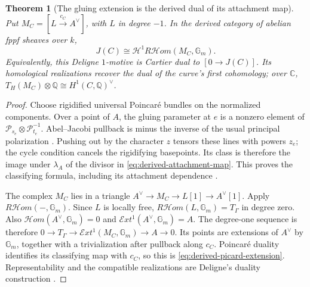 \documentclass[11pt]{article}
\newtheorem{theorem}{Theorem}[section]
\theoremstyle{definition}
\theoremstyle{remark}
\newcommand{\Q}{\mathbb Q}
\newcommand{\C}{\mathbb C}
\begin{document}
\begin{theorem}[The gluing extension is the derived dual of its attachment map]
\label{thm:derived-picard-duality}
Put $M_C=[L\xrightarrow{c_C}A^\vee]$, with $L$ in degree $-1$.
In the derived category of abelian fppf sheaves over $k$,
\begin{equation}\label{eq:derived-ext-jacobian}
 J(C)\cong\mathcal H^1R\mathcal Hom(M_C,\mathbb G_m).
\end{equation}
Equivalently, this Deligne $1$-motive is Cartier dual to $[0\to J(C)]$.
Its homological realizations recover the dual of the curve's first
cohomology; over $\C$,
$T_H(M_C)\otimes\Q\cong H^1(C,\Q)^\vee$.
\end{theorem}

\begin{proof}
Choose rigidified universal Poincar\'{e} bundles on the normalized
components. Over a point of $A$, the gluing parameter at $e$ is a nonzero
element of $\mathcal P_{s_e}\otimes\mathcal P_{t_e}^{-1}$.
Abel--Jacobi pullback is minus the inverse of the usual principal
polarization \cite[Lemma 6.9 and Summary 6.11]{MilneJacobianVarieties}.
Pushing out by the character $z$ tensors these lines with powers $z_e$;
the cycle condition cancels the rigidifying basepoints. Its class is
therefore the image under $\lambda_A$ of the divisor in
\eqref{eq:derived-attachment-map}. This proves the classifying
formula, including its attachment dependence
\cite[\S3.0--3.1.1]{CaporasoVivianiStableTorelli}.

The complex $M_C$ lies in a triangle
$A^\vee\to M_C\to L[1]\to A^\vee[1]$.
Apply $R\mathcal Hom(-,\mathbb G_m)$. Since $L$ is locally free,
$R\mathcal Hom(L,\mathbb G_m)=T_\Gamma$ in degree zero. Also
$\mathcal Hom(A^\vee,\mathbb G_m)=0$ and
$\mathcal Ext^1(A^\vee,\mathbb G_m)=A$. The degree-one sequence is
therefore $0\to T_\Gamma\to\mathcal Ext^1(M_C,\mathbb G_m)\to A\to0$.
Its points are extensions of $A^\vee$ by $\mathbb G_m$, together with a
trivialization after pullback along $c_C$. Poincar\'{e} duality identifies
its classifying map with $c_C$, so this is \eqref{eq:derived-picard-extension}.
Representability and the compatible realizations are Deligne's duality
construction \cite[\S10.2.10--10.2.13, \S10.3]{DeligneHodgeIII}.
\end{proof}
\end{document}

